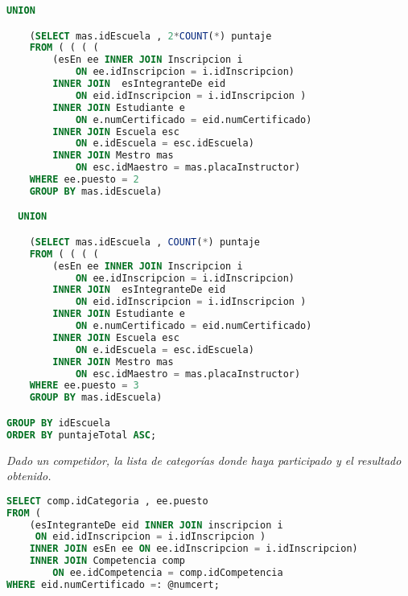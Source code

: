 \begin{lstlisting}[language=SQL]
  UNION

    (SELECT mas.idEscuela , 2*COUNT(*) puntaje
    FROM ( ( ( (
        (esEn ee INNER JOIN Inscripcion i
            ON ee.idInscripcion = i.idInscripcion)
        INNER JOIN  esIntegranteDe eid
            ON eid.idInscripcion = i.idInscripcion )
        INNER JOIN Estudiante e
            ON e.numCertificado = eid.numCertificado)
        INNER JOIN Escuela esc
            ON e.idEscuela = esc.idEscuela)
        INNER JOIN Mestro mas
            ON esc.idMaestro = mas.placaInstructor)
    WHERE ee.puesto = 2
    GROUP BY mas.idEscuela)

  UNION

    (SELECT mas.idEscuela , COUNT(*) puntaje
    FROM ( ( ( (
        (esEn ee INNER JOIN Inscripcion i
            ON ee.idInscripcion = i.idInscripcion)
        INNER JOIN  esIntegranteDe eid
            ON eid.idInscripcion = i.idInscripcion )
        INNER JOIN Estudiante e
            ON e.numCertificado = eid.numCertificado)
        INNER JOIN Escuela esc
            ON e.idEscuela = esc.idEscuela)
        INNER JOIN Mestro mas
            ON esc.idMaestro = mas.placaInstructor)
    WHERE ee.puesto = 3
    GROUP BY mas.idEscuela)

GROUP BY idEscuela
ORDER BY puntajeTotal ASC;
\end{lstlisting}


\emph{Dado un competidor, la lista de categorías donde haya participado y el resultado obtenido.}
\begin{lstlisting}[language=SQL]
SELECT comp.idCategoria , ee.puesto
FROM (
    (esIntegranteDe eid INNER JOIN inscripcion i
     ON eid.idInscripcion = i.idInscripcion )
    INNER JOIN esEn ee ON ee.idInscripcion = i.idInscripcion)
    INNER JOIN Competencia comp
        ON ee.idCompetencia = comp.idCompetencia
WHERE eid.numCertificado =: @numcert;
\end{lstlisting}




